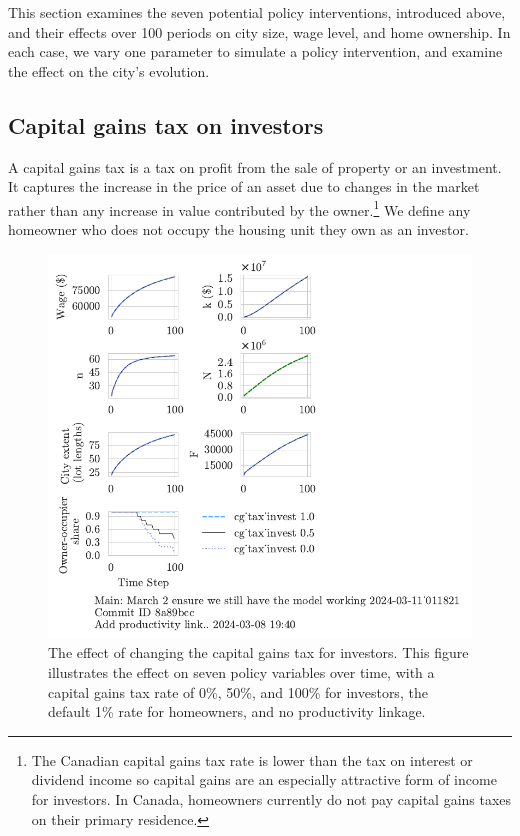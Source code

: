 This section examines the seven potential policy interventions, introduced above, and their effects over 100 periods on city size, wage level, and home ownership. In each case, we vary one parameter to simulate a policy  intervention, %
and examine the effect on the city's evolution.

\subsection{Capital gains tax on investors}
A \gls{capital gains} tax is a tax on profit from the sale of property or an investment. It captures the increase in the price of an asset due to changes in the market rather than any increase in value contributed by the owner.\footnote{The Canadian capital gains tax rate is lower than the tax on interest or dividend income so capital gains are an especially attractive form of income for investors. In Canada, homeowners currently do not pay capital gains taxes on their primary residence. %
} We define any homeowner who does not occupy the housing unit they own as an investor. 
\begin{figure}[!hbtp]
\centering
\includegraphics[scale=0.9, trim={0 1.4cm 4cm 0},clip]{fig/cg_tax_invest-Main-011821.pdf}
\caption[The effect of changing the capital gains tax for investors]{The effect of changing the capital gains tax for investors. This figure illustrates the effect on seven policy variables over time, with a capital gains tax rate of 0\%, 50\%, and 100\% for investors, the default 1\% rate for homeowners, and no productivity linkage.}
\label{fig:CGinvest_ownership_trajectory}
\end{figure}
